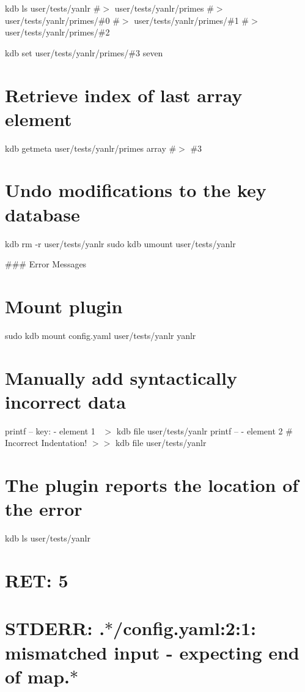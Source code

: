 kdb ls user/tests/yanlr \#$>$ user/tests/yanlr/primes \#$>$ user/tests/yanlr/primes/\#0 \#$>$ user/tests/yanlr/primes/\#1 \#$>$ user/tests/yanlr/primes/\#2

kdb set user/tests/yanlr/primes/\#3 seven

\section*{Retrieve index of last array element}

kdb getmeta user/tests/yanlr/primes array \#$>$ \#3

\section*{Undo modifications to the key database}

kdb rm -\/r user/tests/yanlr sudo kdb umount user/tests/yanlr 
\begin{DoxyCode}
### Error Messages
\end{DoxyCode}
 \section*{Mount plugin}

sudo kdb mount config.\+yaml user/tests/yanlr yanlr

\section*{Manually add syntactically incorrect data}

printf -- \textquotesingle{}key\+: -\/ element 1~\newline
\textquotesingle{} $>$ {\ttfamily kdb file user/tests/yanlr} printf -- \textquotesingle{}-\/ element 2 \# Incorrect Indentation!\textquotesingle{} $>$$>$ {\ttfamily kdb file user/tests/yanlr}

\section*{The plugin reports the location of the error}

kdb ls user/tests/yanlr \section*{R\+ET\+: 5}

\section*{S\+T\+D\+E\+RR\+: .$\ast$/config.yaml\+:2\+:1\+: mismatched input \textquotesingle{}-\/ \textquotesingle{} expecting end of map.$\ast$}

